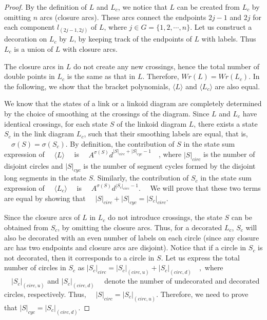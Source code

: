 \documentclass[10pt,a4paper]{amsart}
\begin{document}
\begin{proof}
By the definition of $L$ and $L_c$, we notice that $L$ can be created from $L_c$ by omitting $n$ arcs (closure arcs). These arcs connect the endpoints $2j-1$ and $2j$ for each component $l_{(2j-1,2j)}$ of $L$, where $j \in G=\{1, 2, \cdots, n\}$. Let us construct a decoration on $L_c$ by $L$, by keeping track of the endpoints of $L$ with labels. Thus $L_c$ is a union of $L$ with closure arcs. 


The closure arcs in $L$ do not create any new crossings, hence the total number of double points in $L_c$ is the same as that in $L$. Therefore, $Wr(L) = Wr(L_c)$. In the following, we show that the bracket polynomials, $\langle L \rangle$ and $\langle L_c \rangle$ are also equal. 


We know that the states of a link or a linkoid diagram are completely determined by the choice of smoothing at the crossings of the diagram.  Since $L$ and $L_c$ have identical crossings, for each state $S$ of the linkoid diagram $L$, there exists a state $S_c$ in the link diagram $L_c$, such that their smoothing labels are equal, that is, $\quad \sigma(S) = \sigma(S_c)$. 
By definition, the contribution of $S$ in the state sum expression of $\quad \langle L \rangle \quad$ is $ \quad A^{\sigma(S)} d^{|S|_{circ}  + |S|_{cyc}-1} \quad$, where $|S|_{circ}$ is the number of disjoint circles and 
$|S|_{cyc}$ is the number of segment cycles formed by the disjoint long segments in the state $S$.  
Similarly, the contribution of $S_c$ in the state sum expression of $\quad \langle L_c \rangle \quad$ is $\quad A^{\sigma(S)} d^{|S_c|_{circ} -1}. \quad$ We will prove that these two terms are equal by showing that $\quad |S|_{circ}+|S|_{cyc}= |S_c|_{circ}$. 


Since the closure arcs of $L$ in $L_c$ do not introduce crossings, the state $S$ can be obtained from  $S_c$, by omitting the closure arcs. Thus, for a decorated $L_c$, $S_c$ will also be decorated with an even number of labels on each circle (since any closure arc has two endpoints and closure arcs are disjoint). Notice that if a circle in $S_c$ is not decorated, then it corresponds to a circle in $S$.
Let us express the total number of circles in $S_c$ as  $|S_c|_{circ} = |S_c|_{(circ,u)} + |S_c|_{(circ,d)} \quad ,$ where $\quad |S_c|_{(circ,u)}$ and $|S_c|_{(circ,d)} \quad$ denote the number of undecorated and decorated circles, respectively. Thus, $\quad |S|_{circ} = |S_c|_{(circ,u)}$. Therefore, we need to prove that $|S|_{cyc}= |S_c|_{(circ,d)}$.


\end{proof}
\end{document}
